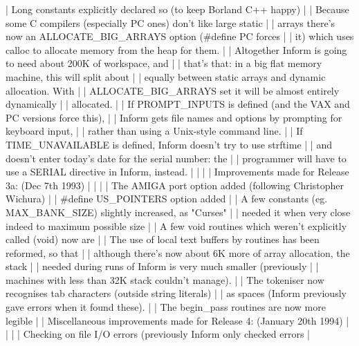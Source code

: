 |     Long constants explicitly declared so (to keep Borland C++ happy)     |
|     Because some C compilers (especially PC ones) don't like large static |
|       arrays there's now an ALLOCATE_BIG_ARRAYS option (#define PC forces |
|       it) which uses calloc to allocate memory from the heap for them.    |
|     Altogether Inform is going to need about 200K of workspace, and       |
|       that's that: in a big flat memory machine, this will split about    |
|       equally between static arrays and dynamic allocation.  With         |
|       ALLOCATE_BIG_ARRAYS set it will be almost entirely dynamically      |
|       allocated.                                                          |
|     If PROMPT_INPUTS is defined (and the VAX and PC versions force this), |
|       Inform gets file names and options by prompting for keyboard input, |
|       rather than using a Unix-style command line.                        |
|     If TIME_UNAVAILABLE is defined, Inform doesn't try to use strftime    |
|       and doesn't enter today's date for the serial number: the           |
|       programmer will have to use a SERIAL directive in Inform, instead.  |
|                                                                           |
|     Improvements made for Release 3a:  (Dec 7th 1993)                     |
|                                                                           |
|      The AMIGA port option added (following Christopher Wichura)          |
|      #define US_POINTERS option added                                     |
|      A few constants (eg. MAX_BANK_SIZE) slightly increased, as "Curses"  |
|        needed it when very close indeed to maximum possible size          |
|     A few void routines which weren't explicitly called (void) now are    |
|     The use of local text buffers by routines has been reformed, so that  |
|       although there's now about 6K more of array allocation, the stack   |
|       needed during runs of Inform is very much smaller (previously       |
|       machines with less than 32K stack couldn't manage).                 |
|     The tokeniser now recognises tab characters (outside string literals) |
|       as spaces (Inform previously gave errors when it found these).      |
|     The begin_pass routines are now more legible                          |
\endlines
\medskip
{}
\beginlines
|     Miscellaneous improvements made for Release 4:  (January 20th 1994)   |
|                                                                           |
|     Checking on file I/O errors (previously Inform only checked errors    |
